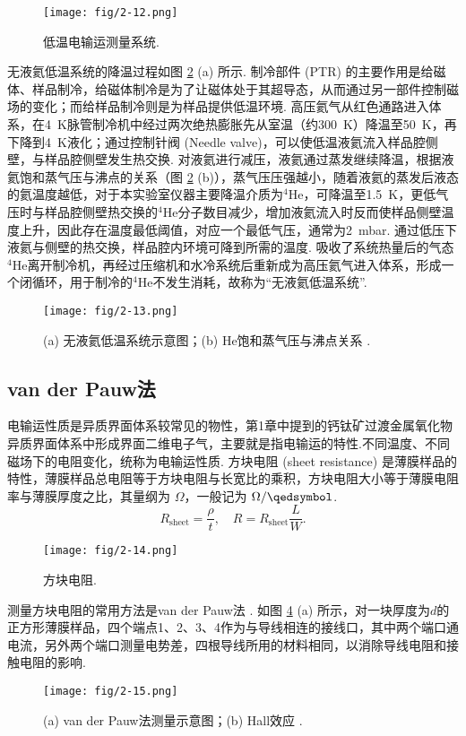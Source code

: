 \documentclass[12pt,a4paper,openany,twoside,UTF-8]{book}
\begin{document}
\begin{figure}[htbp]
\centering
\texttt{[image: fig/2-12.png]}
\caption{低温电输运测量系统.}
\label{fig:2-12} 
\end{figure}

无液氦低温系统的降温过程如图 \ref{fig:2-13} (a) 所示. 制冷部件 (PTR) 的主要作用是给磁体、样品制冷，给磁体制冷是为了让磁体处于其超导态，从而通过另一部件控制磁场的变化；而给样品制冷则是为样品提供低温环境. 高压氦气从红色通路进入体系，在\SI{4} {K}脉管制冷机中经过两次绝热膨胀先从室温（约\SI{300}{K}）降温至\SI{50}{K}，再下降到\SI{4}{K}液化；通过控制针阀 (Needle valve)，可以使低温液氦流入样品腔侧壁，与样品腔侧壁发生热交换. 对液氦进行减压，液氦通过蒸发继续降温，根据液氦饱和蒸气压与沸点的关系（图 \ref{fig:2-13} (b)），蒸气压压强越小，随着液氦的蒸发后液态的氦温度越低，对于本实验室仪器主要降温介质为$^4$He，可降温至\SI{1.5}{K}，更低气压时与样品腔侧壁热交换的$^4$He分子数目减少，增加液氦流入时反而使样品侧壁温度上升，因此存在温度最低阈值，对应一个最低气压，通常为\SI{2}{mbar}. 通过低压下液氦与侧壁的热交换，样品腔内环境可降到所需的温度. 吸收了系统热量后的气态$^4$He离开制冷机，再经过压缩机和水冷系统后重新成为高压氦气进入体系，形成一个闭循环，用于制冷的$^4$He不发生消耗，故称为“无液氦低温系统”.

\begin{figure}[htbp]
\centering
\texttt{[image: fig/2-13.png]}
\caption{ (a) 无液氦低温系统示意图；(b) He饱和蒸气压与沸点关系 \cite{ref33}.}
\label{fig:2-13} 
\end{figure}

\subsection{van der Pauw法}
电输运性质是异质界面体系较常见的物性，第1章中提到的钙钛矿过渡金属氧化物异质界面体系中形成界面二维电子气，主要就是指电输运的特性.不同温度、不同磁场下的电阻变化，统称为电输运性质. 方块电阻 (sheet resistance) 是薄膜样品的特性，薄膜样品总电阻等于方块电阻与长宽比的乘积，方块电阻大小等于薄膜电阻率与薄膜厚度之比，其量纲为 $\Omega$，一般记为 $\Omega/\qedsymbol$. 
\begin{equation}
R_{\mathrm{sheet}}=\frac{\rho}{t},\quad R=R_{\mathrm{sheet}}\frac{L}{W}.
\label{eq:2-9}
\end{equation}
\begin{figure}[htbp]
\centering
\texttt{[image: fig/2-14.png]}
\caption{方块电阻.}
\label{fig:2-14} 
\end{figure}

测量方块电阻的常用方法是van der Pauw法 \cite{ref35}. 如图 \ref{fig:2-15} (a) 所示，对一块厚度为$d$的正方形薄膜样品，四个端点1、2、3、4作为与导线相连的接线口，其中两个端口通电流，另外两个端口测量电势差，四根导线所用的材料相同，以消除导线电阻和接触电阻的影响. 
\begin{figure}[htbp]
\centering
\texttt{[image: fig/2-15.png]}
\caption{(a) van der Pauw法测量示意图；(b) Hall效应 \cite{ref34}.}
\label{fig:2-15} 
\end{figure}
\end{document}
